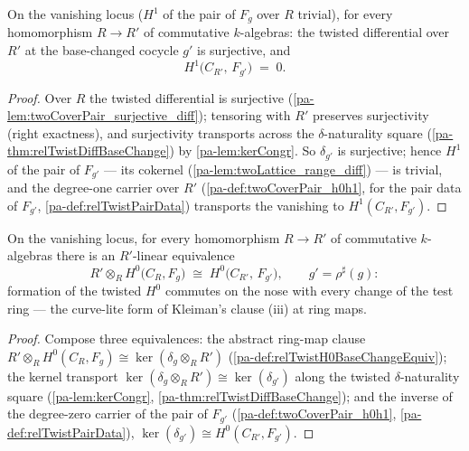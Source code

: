 \begin{theorem}
  \label{pa-thm:relTwist_h1_baseChange}
  \leanok

  On the vanishing locus (\(H^1\) of the pair of \(F_g\) over \(R\) trivial), for
  every homomorphism \(R \to R'\) of commutative \(k\)-algebras: the twisted
  differential over \(R'\) at the base-changed cocycle \(g'\) is surjective, and
  \[
    H^1\bigl(C_{R'},\, F_{g'}\bigr) \;=\; 0 .
  \]
\end{theorem}
\begin{proof}
  \leanok
  Over \(R\) the twisted differential is surjective
  (\ref{pa-lem:twoCoverPair_surjective_diff}); tensoring with \(R'\) preserves
  surjectivity (right exactness), and surjectivity transports across the
  \(\delta\)-naturality square (\ref{pa-thm:relTwistDiffBaseChange}) by
  \ref{pa-lem:kerCongr}. So \(\delta_{g'}\) is surjective; hence \(H^1\) of the pair of
  \(F_{g'}\) --- its cokernel (\ref{pa-lem:twoLattice_range_diff}) --- is trivial, and
  the degree-one carrier over \(R'\) (\ref{pa-def:twoCoverPair_h0h1}, for the pair data
  of \(F_{g'}\), \ref{pa-def:relTwistPairData}) transports the vanishing to
  \(H^1(C_{R'}, F_{g'})\).
\end{proof}

\begin{definition}
  \label{pa-def:relTwistH0BaseChange}
  \leanok

  On the vanishing locus, for every homomorphism \(R \to R'\) of commutative
  \(k\)-algebras there is an \(R'\)-linear equivalence
  \[
    R' \otimes_R H^0\bigl(C_R, F_g\bigr) \;\cong\;
      H^0\bigl(C_{R'},\, F_{g'}\bigr), \qquad g' = \rho^{\sharp}(g) :
  \]
  formation of the twisted \(H^0\) commutes on the nose with every change of the test
  ring --- the curve-lite form of Kleiman's clause (iii) at ring maps.
\end{definition}
\begin{proof}
  \leanok
  Compose three equivalences: the abstract ring-map clause
  \(R' \otimes_R H^0(C_R, F_g) \cong \ker(\delta_g \otimes_R R')\)
  (\ref{pa-def:relTwistH0BaseChangeEquiv}); the kernel transport
  \(\ker(\delta_g \otimes_R R') \cong \ker(\delta_{g'})\) along the twisted
  \(\delta\)-naturality square (\ref{pa-lem:kerCongr},
  \ref{pa-thm:relTwistDiffBaseChange}); and the inverse of the degree-zero carrier of the
  pair of \(F_{g'}\) (\ref{pa-def:twoCoverPair_h0h1}, \ref{pa-def:relTwistPairData}),
  \(\ker(\delta_{g'}) \cong H^0(C_{R'}, F_{g'})\).
\end{proof}

